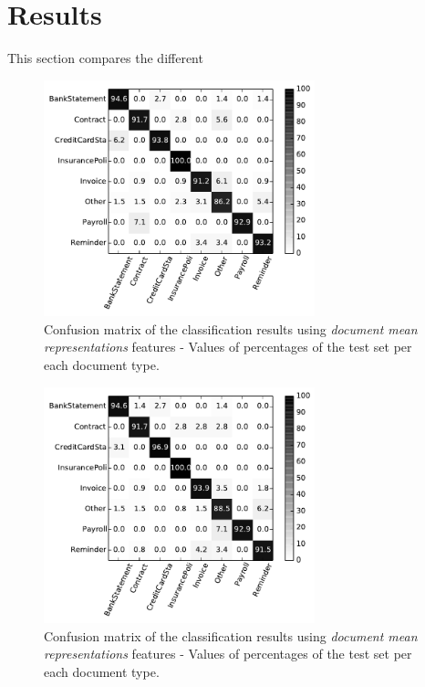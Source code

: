 \section{Results}
\label{sec:w2v4tc_results}

This section compares the different 



 

\begin{figure}[h]
    \centering
    \includegraphics[width=0.7\textwidth]{images/002-xvalidaton-dmr.pdf}
    \caption{Confusion matrix of the classification results  using \textit{document mean
      representations} features - Values of percentages of the test set per
    each document type.}
    \label{fig:confusion-matrix-dmr}
\end{figure}


\begin{figure}[h]
    \centering
    \includegraphics[width=0.7\textwidth]{images/003-xvalidaton-bow.pdf}
    \caption{Confusion matrix of the classification results  using \textit{document mean
      representations} features - Values of percentages of the test set per
    each document type.}
    \label{fig:confusion-matrix-bow}
\end{figure}




